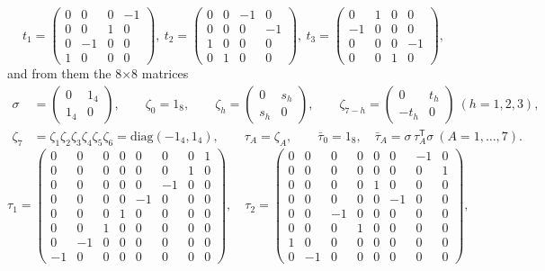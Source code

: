 \documentclass[10pt,a4paper]{article}
\begin{document}
\begin{equation*}
t_1=\begin{pmatrix}0 & 0 & 0 & -1 \\ 0 & 0 & 1 & 0 \\ 0 & -1 & 0 & 0 \\ 1 & 0 & 0 & 0\end{pmatrix},\ t_2=\begin{pmatrix}0 & 0 & -1 & 0 \\ 0 & 0 & 0 & -1 \\ 1 & 0 & 0 & 0 \\ 0 & 1 & 0 & 0\end{pmatrix},\ t_3=\begin{pmatrix}0 & 1 & 0 & 0 \\ -1 & 0 & 0 & 0 \\ 0 & 0 & 0 & -1 \\ 0 & 0 & 1 & 0\end{pmatrix},
\end{equation*}
and from them the 8×8 matrices
\begin{align*}
\sigma&=\begin{pmatrix}0&1_4\\1_4&0\end{pmatrix},\qquad \zeta_0=1_8,\qquad \zeta_h=\begin{pmatrix}0&s_h\\s_h&0\end{pmatrix},\qquad \zeta_{7-h}=\begin{pmatrix}0&t_h\\-t_h&0\end{pmatrix}\ (h=1,2,3), \\
\zeta_7&=\zeta_1\zeta_2\zeta_3\zeta_4\zeta_5\zeta_6=\mathrm{diag}(-1_4,1_4),\qquad \tau_A=\zeta_A,\qquad \bar\tau_0=1_8,\quad \bar\tau_A=\sigma\,\tau_A^{\mathsf T}\sigma\ (A=1,\dots,7).
\end{align*}
\begin{equation*}
\tau_1=\begin{pmatrix}0 & 0 & 0 & 0 & 0 & 0 & 0 & 1 \\ 0 & 0 & 0 & 0 & 0 & 0 & 1 & 0 \\ 0 & 0 & 0 & 0 & 0 & -1 & 0 & 0 \\ 0 & 0 & 0 & 0 & -1 & 0 & 0 & 0 \\ 0 & 0 & 0 & 1 & 0 & 0 & 0 & 0 \\ 0 & 0 & 1 & 0 & 0 & 0 & 0 & 0 \\ 0 & -1 & 0 & 0 & 0 & 0 & 0 & 0 \\ -1 & 0 & 0 & 0 & 0 & 0 & 0 & 0\end{pmatrix},\quad \tau_2=\begin{pmatrix}0 & 0 & 0 & 0 & 0 & 0 & -1 & 0 \\ 0 & 0 & 0 & 0 & 0 & 0 & 0 & 1 \\ 0 & 0 & 0 & 0 & 1 & 0 & 0 & 0 \\ 0 & 0 & 0 & 0 & 0 & -1 & 0 & 0 \\ 0 & 0 & -1 & 0 & 0 & 0 & 0 & 0 \\ 0 & 0 & 0 & 1 & 0 & 0 & 0 & 0 \\ 1 & 0 & 0 & 0 & 0 & 0 & 0 & 0 \\ 0 & -1 & 0 & 0 & 0 & 0 & 0 & 0\end{pmatrix},
\end{equation*}
\end{document}
